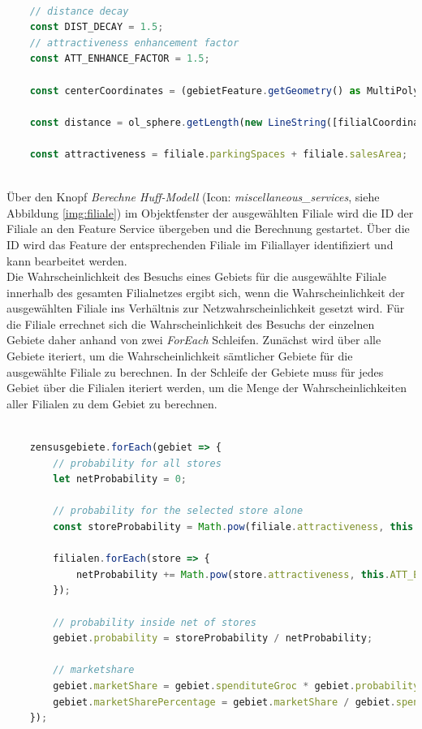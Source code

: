 \begin{lstlisting}[language=JavaScript, caption={Huff-Modell Variablen und Parameter}]
	
	// distance decay
	const DIST_DECAY = 1.5;
	// attractiveness enhancement factor
	const ATT_ENHANCE_FACTOR = 1.5;
	
	const centerCoordinates = (gebietFeature.getGeometry() as MultiPolygon).getInteriorPoints().getFirstCoordinate();
	
	const distance = ol_sphere.getLength(new LineString([filialCoordinates, centerCoordinates]), {projection: 'EPSG:3857'});
	
	const attractiveness = filiale.parkingSpaces + filiale.salesArea;
	
\end{lstlisting}

Über den Knopf \emph{Berechne Huff-Modell} (Icon: \emph{miscellaneous\_services}, siehe Abbildung \ref{img:filiale}) im Objektfenster der ausgewählten Filiale wird die ID der Filiale an den Feature Service übergeben und die Berechnung gestartet.
Über die ID wird das Feature der entsprechenden Filiale im Filiallayer identifiziert und kann bearbeitet werden.\\
Die Wahrscheinlichkeit des Besuchs eines Gebiets für die ausgewählte Filiale innerhalb des gesamten Filialnetzes ergibt sich, wenn die Wahrscheinlichkeit der ausgewählten Filiale ins Verhältnis zur Netzwahrscheinlichkeit gesetzt wird.
Für die Filiale errechnet sich die Wahrscheinlichkeit des Besuchs der einzelnen Gebiete daher anhand von zwei \emph{ForEach} Schleifen.
Zunächst wird über alle Gebiete iteriert, um die Wahrscheinlichkeit sämtlicher Gebiete für die ausgewählte Filiale zu berechnen.
In der Schleife der Gebiete muss für jedes Gebiet über die Filialen iteriert werden, um die Menge der Wahrscheinlichkeiten aller Filialen zu dem Gebiet zu berechnen.

\begin{lstlisting}[language=JavaScript, caption={Berechnung des Huff-Modells}]
	
	zensusgebiete.forEach(gebiet => {
		// probability for all stores
		let netProbability = 0;
		
		// probability for the selected store alone
		const storeProbability = Math.pow(filiale.attractiveness, this.ATT_ENHANCE_FACTOR) / Math.pow(distance, this.DIST_DECAY);
		
		filialen.forEach(store => {
			netProbability += Math.pow(store.attractiveness, this.ATT_ENHANCE_FACTOR) / Math.pow(this.calculateDistancesForFiliale(store.coordinates, gebiet.coordinates), this.DIST_DECAY);
		});
	
		// probability inside net of stores
		gebiet.probability = storeProbability / netProbability;

		// marketshare
		gebiet.marketShare = gebiet.spendituteGroc * gebiet.probability;
		gebiet.marketSharePercentage = gebiet.marketShare / gebiet.spendituteGroc;
	});
\end{lstlisting}

